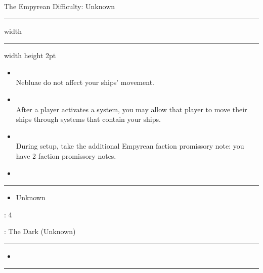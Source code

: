 {\handel\Huge The Empyrean} \hfill {\Large Difficulty: Unknown} \vspace{-4pt}\\
\hrule width \hsize \kern 1mm \hrule width \hsize height 2pt


\begin{multicols}{2}


\begin{itemize}
\item {}\\
Nebluae do not affect your ships' movement.
\item {}\\
After a player activates a system, you may allow that player to move their ships through systems that contain your ships.
\item {}\\
During setup, take the additional Empyrean faction promissory note: you have 2 faction promissory notes.
\item 
\end{itemize}


\vspace{-10pt}\rule{\hsize}{0.4pt}\vspace{5pt}


\vspace{-5pt}
\begin{multicols}{2}
\begin{itemize}
\item Unknown %
\end{itemize}
\end{multicols}

\vspace{-5pt}
: 4

\vspace{2pt}
: The Dark (Unknown) %

\rule{\hsize}{0.4pt}\vspace{5pt}


\begin{itemize}
\item \tap
\end{itemize}

\vspace{-10pt}\rule{\hsize}{0.4pt}\vspace{5pt}


\end{multicols}
